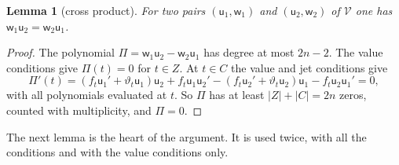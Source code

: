 \documentclass[11pt]{amsart}
\newtheorem{lemma}[theorem]{Lemma}
\theoremstyle{definition}
\theoremstyle{remark}
\numberwithin{equation}{section}
\begin{document}
\begin{lemma}[cross product]\label{lem:cross}
For two pairs $(\mathsf u_1,\mathsf w_1)$ and $(\mathsf u_2,\mathsf w_2)$ of $\mathcal V$ one has
$\mathsf w_1\mathsf u_2=\mathsf w_2\mathsf u_1$.
\end{lemma}
\begin{proof}
The polynomial $\Pi=\mathsf w_1\mathsf u_2-\mathsf w_2\mathsf u_1$ has degree at most $2n-2$. The value conditions give
$\Pi(t)=0$ for $t\in Z$. At $t\in C$ the value and jet conditions give
\[
 \Pi'(t)=(f_t\mathsf u_1'+\vartheta_t\mathsf u_1)\mathsf u_2+f_t\mathsf u_1\mathsf u_2'
 -(f_t\mathsf u_2'+\vartheta_t\mathsf u_2)\mathsf u_1-f_t\mathsf u_2\mathsf u_1'=0,
\]
with all polynomials evaluated at $t$. So $\Pi$ has at least $|Z|+|C|=2n$ zeros, counted with multiplicity, and
$\Pi=0$.
\end{proof}

The next lemma is the heart of the argument. It is used twice, with all the conditions and with the value conditions
only.
\end{document}
